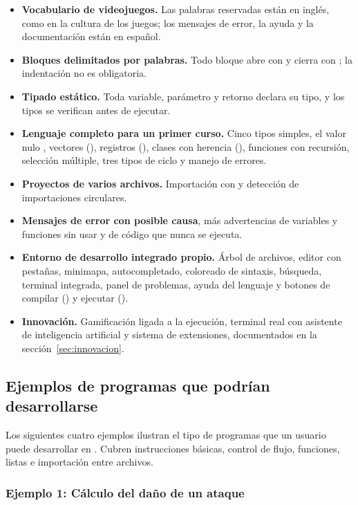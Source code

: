 \begin{itemize}
  \item \textbf{Vocabulario de videojuegos.} Las palabras reservadas están en inglés, como en la cultura de los juegos; los mensajes de error, la ayuda y la documentación están en español.
  \item \textbf{Bloques delimitados por palabras.} Todo bloque abre con  y cierra con ; la indentación no es obligatoria.
  \item \textbf{Tipado estático.} Toda variable, parámetro y retorno declara su tipo, y los tipos se verifican antes de ejecutar.
  \item \textbf{Lenguaje completo para un primer curso.} Cinco tipos simples, el valor nulo , vectores (), registros (), clases con herencia (), funciones con recursión, selección múltiple, tres tipos de ciclo y manejo de errores.
  \item \textbf{Proyectos de varios archivos.} Importación con  y detección de importaciones circulares.
  \item \textbf{Mensajes de error con posible causa}, más advertencias de variables y funciones sin usar y de código que nunca se ejecuta.
  \item \textbf{Entorno de desarrollo integrado propio.} Árbol de archivos, editor con pestañas, minimapa, autocompletado, coloreado de sintaxis, búsqueda, terminal integrada, panel de problemas, ayuda del lenguaje y botones de compilar () y ejecutar ().
  \item \textbf{Innovación.} Gamificación ligada a la ejecución, terminal real con asistente de inteligencia artificial y sistema de extensiones, documentados en la sección~\ref{sec:innovacion}.
\end{itemize}

\subsection{Ejemplos de programas que podrían desarrollarse}

Los siguientes cuatro ejemplos ilustran el tipo de programas que un usuario puede desarrollar en \ggez. Cubren instrucciones básicas, control de flujo, funciones, listas e importación entre archivos.

\subsubsection*{Ejemplo 1: Cálculo del daño de un ataque}

